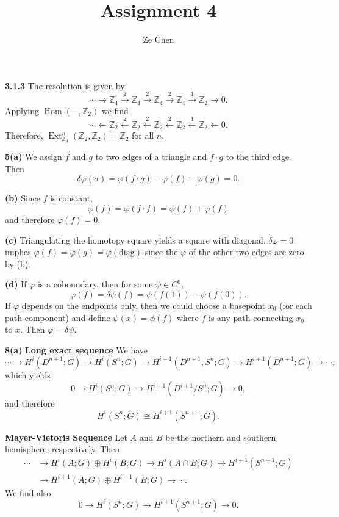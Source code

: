 \documentclass{article}
\title{Assignment 4}
\author{Ze Chen}
\makeatletter
\newcommand*{\shifttext}[1]{%
  \settowidth{\@tempdima}{#1}%
  \hspace{-\@tempdima}#1%
}
\newcommand{\plabel}[1]{%
\shifttext{\textbf{#1}\quad}%
}
\makeatother
\begin{document}
\maketitle

\plabel{3.1.3}%
The resolution is given by
\[ \cdots \rightarrow \mathbb{Z}_4 \xrightarrow{2} \mathbb{Z}_4 \xrightarrow{2} \mathbb{Z}_4 \xrightarrow{2} \mathbb{Z}_4 \xrightarrow{1} \mathbb{Z}_2 \rightarrow 0. \]
Applying $\operatorname{Hom}(-,\mathbb{Z}_2)$ we find
\[ \cdots \leftarrow \mathbb{Z}_2 \xleftarrow{2} \mathbb{Z}_2 \xleftarrow{2} \mathbb{Z}_2 \xleftarrow{2} \mathbb{Z}_2 \xleftarrow{1} \mathbb{Z}_2 \leftarrow 0. \]
Therefore, $\operatorname{Ext}^n_{\mathbb{Z}_4}(\mathbb{Z}_2,\mathbb{Z}_2) = \mathbb{Z}_2$ for all $n$.

\plabel{5(a)}%
We assign $f$ and $g$ to two edges of a triangle and $f\cdot g$ to the third edge.
Then
\[ \delta\varphi(\sigma) = \varphi(f\cdot g) - \varphi(f) - \varphi(g) = 0. \]

\plabel{(b)}%
Since $f$ is constant,
\[ \varphi(f) = \varphi(f\cdot f) = \varphi(f) + \varphi(f) \]
and therefore $\varphi(f) = 0$.

\plabel{(c)}%
Triangulating the homotopy square yields a square with diagonal.
$\delta\varphi = 0$ implies $\varphi(f) = \varphi(g) = \varphi(\text{diag})$ since the $\varphi$ of the other two edges are zero by (b).

\plabel{(d)}%
If $\varphi$ is a coboundary, then for some $\psi\in C^0$,
\[ \varphi(f) = \delta \psi(f) = \psi(f(1)) - \psi(f(0)). \]
If $\varphi$ depends on the endpoints only, then we could choose a basepoint $x_0$ (for each path component) and define $\psi(x) = \phi(f)$ where $f$ is any path connecting $x_0$ to $x$.
Then $\varphi = \delta\psi$.

\plabel{8(a)}%
\textbf{Long exact sequence}\quad
We have
\[ \cdots \rightarrow H^i(D^{n+1};G) \rightarrow H^i(S^n;G) \rightarrow H^{i+1}(D^{n+1},S^n;G) \rightarrow H^{i+1}(D^{n+1};G) \rightarrow \cdots, \]
which yields
\[ 0 \rightarrow H^i(S^n;G) \rightarrow H^{i+1}(D^{i+1}/S^n;G) \rightarrow 0, \] 
and therefore
\[ H^i(S^n;G) \cong H^{i+1}(S^{n+1};G). \]

\textbf{Mayer-Vietoris Sequence}\quad
Let $A$ and $B$ be the northern and southern hemisphere, respectively.
Then
\begin{align*}
    \cdots &\rightarrow H^i(A;G) \oplus H^i(B;G) \rightarrow H^i(A\cap B;G) \rightarrow H^{i+1}(S^{n+1};G) \\
    &\rightarrow H^{i+1}(A;G) \oplus H^{i+1}(B;G) \rightarrow \cdots. 
\end{align*}
We find also
\[ 0 \rightarrow H^i(S^n;G) \rightarrow H^{i+1}(S^{n+1};G) \rightarrow 0. \]
\end{document}
